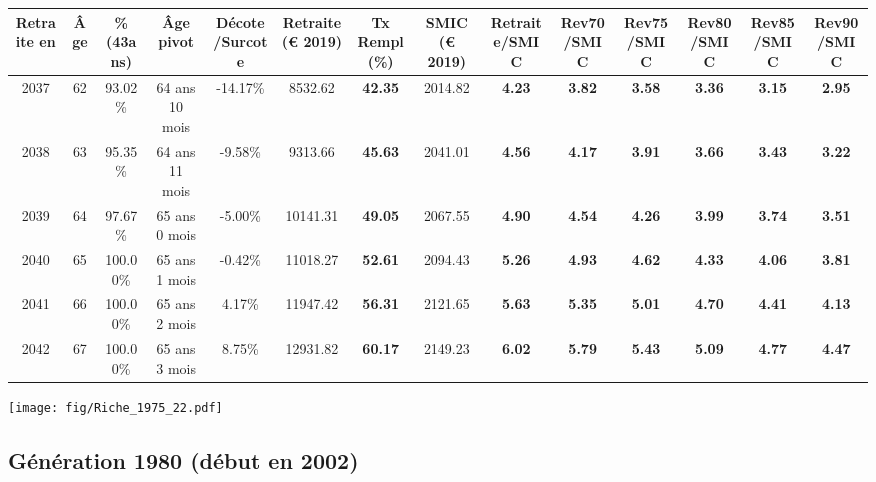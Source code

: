 \begin{adjustbox}{max width=\textwidth} 
\begin{tabular}[htb]{|c|c||c|c|c||c|c||c||c|c|c|c|c|c|} 
\hline 
 Retraite en &  Âge &  \%(43ans) &  Âge pivot &  Décote/Surcote &  Retraite (\euro{} 2019) &  Tx Rempl(\%) &  SMIC (\euro{} 2019) &  Retraite/SMIC &  Rev70/SMIC &  Rev75/SMIC &  Rev80/SMIC &  Rev85/SMIC &  Rev90/SMIC \\ 
\hline \hline 
 2037 &  62 &  93.02\% &  64 ans 10 mois &  -14.17\% &  8532.62 &  {\bf 42.35} &  2014.82 &  {\bf 4.23} &  {\bf 3.82} &  {\bf 3.58} &  {\bf 3.36} &  {\bf 3.15} &  {\bf 2.95} \\ 
\hline 
 2038 &  63 &  95.35\% &  64 ans 11 mois &  -9.58\% &  9313.66 &  {\bf 45.63} &  2041.01 &  {\bf 4.56} &  {\bf 4.17} &  {\bf 3.91} &  {\bf 3.66} &  {\bf 3.43} &  {\bf 3.22} \\ 
\hline 
 2039 &  64 &  97.67\% &  65 ans 0 mois &  -5.00\% &  10141.31 &  {\bf 49.05} &  2067.55 &  {\bf 4.90} &  {\bf 4.54} &  {\bf 4.26} &  {\bf 3.99} &  {\bf 3.74} &  {\bf 3.51} \\ 
\hline 
 2040 &  65 &  100.00\% &  65 ans 1 mois &  -0.42\% &  11018.27 &  {\bf 52.61} &  2094.43 &  {\bf 5.26} &  {\bf 4.93} &  {\bf 4.62} &  {\bf 4.33} &  {\bf 4.06} &  {\bf 3.81} \\ 
\hline 
 2041 &  66 &  100.00\% &  65 ans 2 mois &  4.17\% &  11947.42 &  {\bf 56.31} &  2121.65 &  {\bf 5.63} &  {\bf 5.35} &  {\bf 5.01} &  {\bf 4.70} &  {\bf 4.41} &  {\bf 4.13} \\ 
\hline 
 2042 &  67 &  100.00\% &  65 ans 3 mois &  8.75\% &  12931.82 &  {\bf 60.17} &  2149.23 &  {\bf 6.02} &  {\bf 5.79} &  {\bf 5.43} &  {\bf 5.09} &  {\bf 4.77} &  {\bf 4.47} \\ 
\hline 
\hline 
\end{tabular} 
\end{adjustbox} 
 
 \vspace{0.1cm} 

 \begin{center}\texttt{[image: fig/Riche\_1975\_22.pdf]}\end{center} \label{fig/Riche_1975_22.pdf} 

\newpage 
 
\subsection{Génération 1980 (début en 2002)} 

